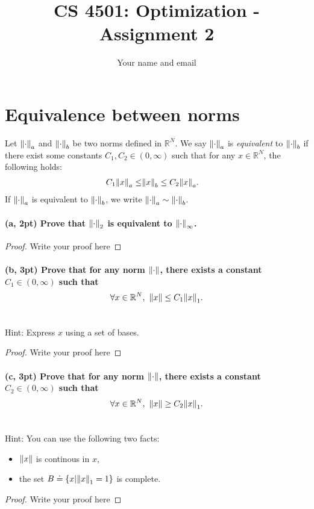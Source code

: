 \documentclass[11pt]{article}
\newcommand{\R}{\mathbb{R}}
\begin{document}
\title{CS 4501: Optimization - Assignment 2}
\author{Your name and email}
\date{}
\maketitle

\section{Equivalence between norms}
Let $\norm{\cdot}_a$ and $\norm{\cdot}_b$ be two norms defined in $\R^N$.
We say $\norm{\cdot}_a$ is \emph{equivalent} to $\norm{\cdot}_b$ if there exist some constants $C_1, C_2 \in (0, \infty)$ such that for any 
$x \in \R^N$,
the following holds:
\begin{align}
  C_1 \norm{x}_a \leq& \norm{x}_b \leq C_2 \norm{x}_a.
\end{align}
If $\norm{\cdot}_a$ is equivalent to $\norm{\cdot}_b$,
we write $\norm{\cdot}_a \sim \norm{\cdot}_b$.
\paragraph{(a, 2pt) Prove that $\norm{\cdot}_2$ is equivalent to $\norm{\cdot}_\infty$.}
\begin{proof}
  Write your proof here
\end{proof}

\paragraph{(b, 3pt) Prove that for any norm $\norm{\cdot}$, there exists a constant $C_1 \in (0, \infty)$ such that $$\forall x \in \R^N, \,\, \norm{x} \leq C_1 \norm{x}_1.$$} \mbox{}\\
Hint: Express $x$ using a set of bases.
\begin{proof}
  Write your proof here
\end{proof}

\paragraph{(c, 3pt) Prove that for any norm $\norm{\cdot}$, there exists a constant $C_2 \in (0, \infty)$ such that $$\forall x \in \R^N, \,\, \norm{x} \geq C_2 \norm{x}_1.$$} \mbox{} \\
Hint: You can use the following two facts:
\begin{itemize}
  \item $\norm{x}$ is continous in $x$,
  \item the set $B \doteq \qty{x | \norm{x}_1 = 1}$ is complete. 
\end{itemize}
\begin{proof}
  Write your proof here
\end{proof}
\end{document}
